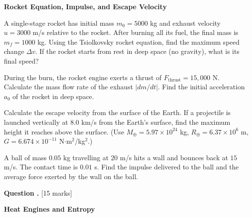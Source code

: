 \documentclass[12pt,a4paper]{article}
\newcounter{questioncounter}
\newcommand{\question}[1]{%
  \stepcounter{questioncounter}%
  \vspace{0.5cm}%
  \noindent\textbf{Question \thequestioncounter.} \hfill [#1 marks]%
  \vspace{0.2cm}%
  \par%
}
\begin{document}
\noindent\textbf{Rocket Equation, Impulse, and Escape Velocity}

\begin{parts}
\item A single-stage rocket has initial mass $m_0 = 5000$ kg and exhaust velocity $u = 3000$ m/s relative to the rocket. After burning all its fuel, the final mass is $m_f = 1000$ kg. Using the Tsiolkovsky rocket equation, find the maximum speed change $\Delta v$. If the rocket starts from rest in deep space (no gravity), what is its final speed? 

\item During the burn, the rocket engine exerts a thrust of $F_{\text{thrust}} = 15{,}000$ N. Calculate the mass flow rate of the exhaust $|dm/dt|$. Find the initial acceleration $a_0$ of the rocket in deep space. 

\item Calculate the escape velocity from the surface of the Earth. If a projectile is launched vertically at $8.0$ km/s from the Earth's surface, find the maximum height it reaches above the surface. (Use $M_{\oplus} = 5.97\times 10^{24}$ kg, $R_{\oplus} = 6.37\times 10^{6}$ m, $G = 6.674\times 10^{-11}$ N$\cdot$m$^2$/kg$^2$.) 

\item A ball of mass $0.05$ kg travelling at $20$ m/s hits a wall and bounces back at $15$ m/s. The contact time is $0.01$ s. Find the impulse delivered to the ball and the average force exerted by the wall on the ball. 
\end{parts}

\newpage

\question{15}

\noindent\textbf{Heat Engines and Entropy}
\end{document}
